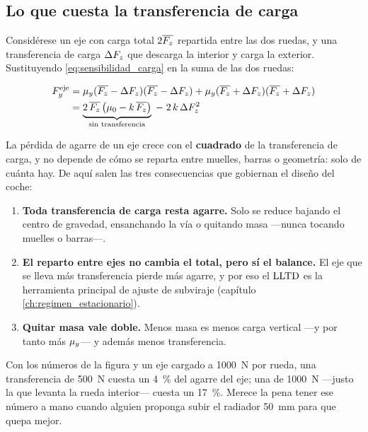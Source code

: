 \subsection{Lo que cuesta la transferencia de carga}

Considérese un eje con carga total $2\overline{F_z}$ repartida entre las dos ruedas,
y una transferencia de carga $\Delta F_z$ que descarga la interior y carga la
exterior. Sustituyendo \eqref{eq:sensibilidad_carga} en la suma de las dos
ruedas:

\begin{align}
  F_y^{\text{eje}}
  &= \mu_y(\overline{F_z}-\Delta F_z)(\overline{F_z}-\Delta F_z)
   + \mu_y(\overline{F_z}+\Delta F_z)(\overline{F_z}+\Delta F_z) \notag \\
  &= \underbrace{2\,\overline{F_z}\,\bigl(\mu_0 - k\,\overline{F_z}\bigr)}
     _{\text{sin transferencia}} \;-\; 2\,k\,\Delta F_z^{2}
  \label{eq:perdida_transferencia}
\end{align}

\begin{clave}
La pérdida de agarre de un eje crece con el \textbf{cuadrado} de la
transferencia de carga, y no depende de cómo se reparta entre muelles, barras o
geometría: solo de cuánta hay. De aquí salen las tres consecuencias que gobiernan
el diseño del coche:

\begin{enumerate}
  \item \textbf{Toda transferencia de carga resta agarre.} Solo se reduce
        bajando el centro de gravedad, ensanchando la vía o quitando masa
        ---nunca tocando muelles o barras---.
  \item \textbf{El reparto entre ejes no cambia el total, pero sí el balance.}
        El eje que se lleva más transferencia pierde más agarre, y por eso el
        $\mathrm{LLTD}$ es la herramienta principal de ajuste de subviraje
        (capítulo \ref{ch:regimen_estacionario}).
  \item \textbf{Quitar masa vale doble.} Menos masa es menos carga vertical
        ---y por tanto más $\mu_y$--- y además menos transferencia.
\end{enumerate}
\end{clave}

Con los números de la figura y un eje cargado a \SI{1000}{\newton} por rueda, una
transferencia de \SI{500}{\newton} cuesta un \SI{4}{\percent} del agarre del eje;
una de \SI{1000}{\newton} ---justo la que levanta la rueda interior--- cuesta un
\SI{17}{\percent}. Merece la pena tener ese número a mano cuando alguien proponga
subir el radiador \SI{50}{\milli\meter} para que quepa mejor.

